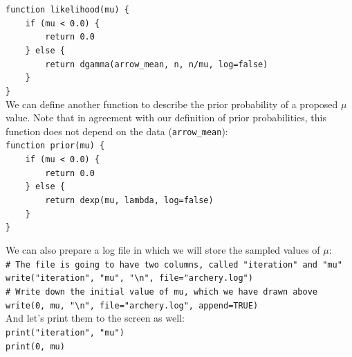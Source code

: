 \documentclass[12pt]{article}
\begin{document}
\indent \texttt{function likelihood(mu) \{} \\
\indent \texttt{\ \ \ \ if (mu < 0.0) \{} \\
\indent \texttt{\ \ \ \ \ \ \ \ return 0.0} \\
\indent \texttt{\ \ \ \ \} else \{} \\
\indent \texttt{\ \ \ \ \ \ \ \ return dgamma(arrow\_mean, n, n/mu, log=false)} \\
\indent \texttt{\ \ \ \ \}} \\
\indent \texttt{\}} \\

\noindent We can define another function to describe the prior probability of a proposed $\mu$ value. Note that in agreement with our definition of prior probabilities, this function does not depend on the data (\texttt{arrow\_mean}): \\

\indent \texttt{function prior(mu) \{} \\
\indent \texttt{\ \ \ \ if (mu < 0.0) \{} \\
\indent \texttt{\ \ \ \ \ \ \ \ return 0.0} \\
\indent \texttt{\ \ \ \ \} else \{} \\
\indent \texttt{\ \ \ \ \ \ \ \ return dexp(mu, lambda, log=false)} \\
\indent \texttt{\ \ \ \ \}} \\
\indent \texttt{\}} \\

\newpage

\noindent We can also prepare a log file in which we will store the sampled values of $\mu$: \\

\indent \texttt{\# The file is going to have two columns, called "iteration" and "mu"} \\
\indent \texttt{write("iteration", "mu", "\textbackslash n", file="archery.log")} \\
\indent \texttt{\# Write down the initial value of mu, which we have drawn above} \\
\indent \texttt{write(0, mu, "\textbackslash n", file="archery.log", append=TRUE)} \\

\noindent And let's print them to the screen as well: \\

\indent \texttt{print("iteration", "mu")} \\
\indent \texttt{print(0, mu)} \\
\end{document}

